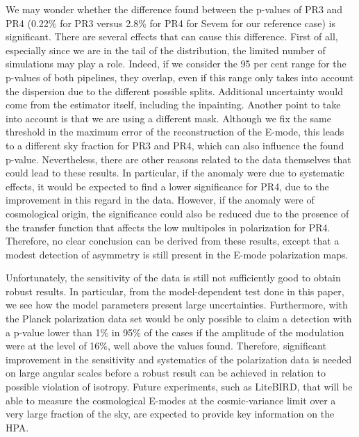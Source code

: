 We may wonder whether the difference found between the p-values of PR3 and PR4 (0.22\% for PR3 versus 2.8\% for PR4 for Sevem for our reference case) is significant. There are several effects that can cause this difference. First of all, especially since we are in the tail of the distribution, the limited number of simulations may play a role. Indeed, if we consider the 95 per cent range for the p-values of both pipelines, they overlap, even if this range only takes into account the dispersion due to the different possible splits. Additional uncertainty would come from the estimator itself, including the inpainting. Another point to take into account is that we are using a different mask. Although we fix the same threshold in the maximum error of the reconstruction of the E-mode, this leads to a different sky fraction for PR3 and PR4, which can also influence the found p-value. Nevertheless, there are other reasons related to the data themselves that could lead to these results. In particular, if the anomaly were due to systematic effects, it would be expected to find a lower significance for PR4, due to the improvement in this regard in the data. However, if the anomaly were of cosmological origin, the significance could also be reduced due to the presence of the transfer function that affects the low multipoles in polarization for PR4. Therefore, no clear conclusion can be derived from these results, except that a modest detection of asymmetry is still present in the E-mode polarization maps.

Unfortunately, the sensitivity of the data is still not sufficiently good to obtain robust results. In particular, from the model-dependent test done in this paper, we see how the model parameters present large uncertainties. Furthermore, with the Planck polarization data set would be only possible to claim a detection with a p-value lower than 1\% in 95\% of the cases if the amplitude of the modulation were at the level of 16\%, well above the values found. Therefore, significant improvement in the sensitivity and systematics of the polarization data is needed on large angular scales before a robust result can be achieved in relation to possible violation of isotropy. Future experiments, such as LiteBIRD, that will be able to measure the cosmological E-modes at the cosmic-variance limit over a very large fraction of the sky, are expected to provide key information on the HPA.
